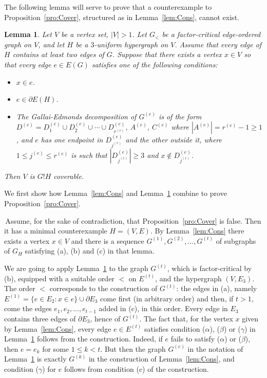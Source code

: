 \documentclass{article}
\newtheorem{lemma}[theorem]{Lemma}
\theoremstyle{definition}
\begin{document}
The following lemma will serve to prove that a counterexample to Proposition~\ref{pro:Cover}, structured as in Lemma~\ref{lem:Cons}, cannot exist.
\begin{lemma} \label{lem:G!H}
Let $V$ be a vertex set, $|V| > 1$. Let $G_<$ be a factor-critical edge-ordered graph on $V$, and let $H$ be a $3$-uniform hypergraph on $V$. Assume that every edge of $H$ contains at least two edges of $G$. Suppose that there exists a vertex $x \in V$ so that every edge $e \in E(G)$ satisfies one of the following conditions:
\begin{itemize}
    \item[($\alpha$)] $x \in e$.
    \item[($\beta$)] $e \in \partial E(H)$.
    \item[($\gamma$)] The Gallai-Edmonds decomposition of $G^{(e)}$ is of the form $D^{(e)} = D_1^{(e)} \cup D_2^{(e)} \cup \cdots \cup D_{r^{(e)}}^{(e)}$, $A^{(e)}$, $C^{(e)}$ where $|A^{(e)}| = r^{(e)} - 1 \ge 1$, and $e$ has one endpoint in $D_{j^{(e)}}^{(e)}$ and the other outside it, where $1 \le j^{(e)} \le r^{(e)}$ is such that $|D_{j^{(e)}}^{(e)}| \ge 3$ and $x \notin D_{j^{(e)}}^{(e)}$.
\end{itemize}
Then $V$ is $G!H$ coverable.
\end{lemma}
We first show how Lemma~\ref{lem:Cons} and Lemma~\ref{lem:G!H} combine to prove Proposition~\ref{pro:Cover}.

\vspace{10pt}

 \,Assume, for the sake of contradiction, that Proposition~\ref{pro:Cover} is false. Then it has a minimal counterexample $H = (V, E)$. By Lemma~\ref{lem:Cons} there exists a vertex $x \in V$ and there is a sequence $G^{(1)}, G^{(2)}, \ldots , G^{(t)}$ of subgraphs of $G_H$ satisfying (a), (b) and (c) in that lemma.

We are going to apply Lemma~\ref{lem:G!H} to the graph $G^{(t)}$, which is factor-critical by (b), equipped with a suitable order $<$ on $E^{(t)}$, and the hypergraph $(V, E_3)$. The order $<$ corresponds to the construction of $G^{(t)}$: the edges in (a), namely $E^{(1)} = \{e \in E_2: x \in e\} \cup \partial E_3$ come first (in arbitrary order) and then, if $t > 1$, come the edges $e_1, e_2, \ldots , e_{t-1}$ added in (c), in this order. Every edge in $E_3$ contains three edges of $\partial E_3$, hence of $G^{(t)}$. The fact that, for the vertex $x$ given by Lemma~\ref{lem:Cons}, every edge $e \in E^{(t)}$ satisfies condition ($\alpha$), ($\beta$) or ($\gamma$) in Lemma~\ref{lem:G!H} follows from the construction. Indeed, if $e$ fails to satisfy ($\alpha$) or ($\beta$), then $e = e_k$ for some $1 \le k < t$. But then the graph $G^{(e)}$ in the notation of Lemma~\ref{lem:G!H} is exactly $G^{(k)}$ in the construction of Lemma~\ref{lem:Cons}, and condition ($\gamma$) for $e$ follows from condition (c) of the construction.
\end{document}
